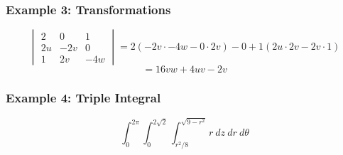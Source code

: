 \subsubsection{Example 3: Transformations}
$$\begin{vmatrix}
  2&0&1\\
  2u&-2v&0\\
  1&2v&-4w
\end{vmatrix}=2(-2v\cdot-4w-0\cdot2v)-0+1(2u\cdot2v-2v\cdot1)$$
$$=16vw+4uv-2v$$

\subsubsection{Example 4: Triple Integral}
$$\int_{0}^{2\pi}\int_{0}^{2\sqrt{2}}\int_{r^2/8}^{\sqrt{9-r^2}}r\ dz\ dr\ d\theta$$
